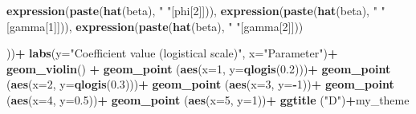 \documentclass[
]{article}
\newenvironment{Shaded}{\begin{snugshade}}{\end{snugshade}}
\newcommand{\AttributeTok}[1]{\textcolor[rgb]{0.13,0.29,0.53}{#1}}
\newcommand{\DecValTok}[1]{\textcolor[rgb]{0.00,0.00,0.81}{#1}}
\newcommand{\FloatTok}[1]{\textcolor[rgb]{0.00,0.00,0.81}{#1}}
\newcommand{\FunctionTok}[1]{\textcolor[rgb]{0.13,0.29,0.53}{\textbf{#1}}}
\newcommand{\NormalTok}[1]{#1}
\newcommand{\SpecialCharTok}[1]{\textcolor[rgb]{0.81,0.36,0.00}{\textbf{#1}}}
\newcommand{\StringTok}[1]{\textcolor[rgb]{0.31,0.60,0.02}{#1}}
\begin{document}
{\begin{Shaded}
\begin{Highlighting}[]
                            \FunctionTok{expression}\NormalTok{(}\FunctionTok{paste}\NormalTok{(}\FunctionTok{hat}\NormalTok{(beta), }\StringTok{" "}\NormalTok{[phi[}\DecValTok{2}\NormalTok{]])),}
                            \FunctionTok{expression}\NormalTok{(}\FunctionTok{paste}\NormalTok{(}\FunctionTok{hat}\NormalTok{(beta), }\StringTok{" "}\NormalTok{[gamma[}\DecValTok{1}\NormalTok{]])),}
                            \FunctionTok{expression}\NormalTok{(}\FunctionTok{paste}\NormalTok{(}\FunctionTok{hat}\NormalTok{(beta), }\StringTok{" "}\NormalTok{[gamma[}\DecValTok{2}\NormalTok{]]))}
                            
                            
\NormalTok{                            ))}\SpecialCharTok{+}
  \FunctionTok{labs}\NormalTok{(}\AttributeTok{y=}\StringTok{"Coefficient value (logistical scale)"}\NormalTok{, }\AttributeTok{x=}\StringTok{"Parameter"}\NormalTok{)}\SpecialCharTok{+}
  \FunctionTok{geom\_violin}\NormalTok{() }\SpecialCharTok{+}
  \FunctionTok{geom\_point}\NormalTok{ (}\FunctionTok{aes}\NormalTok{(}\AttributeTok{x=}\DecValTok{1}\NormalTok{, }\AttributeTok{y=}\FunctionTok{qlogis}\NormalTok{(}\FloatTok{0.2}\NormalTok{)))}\SpecialCharTok{+}
  \FunctionTok{geom\_point}\NormalTok{ (}\FunctionTok{aes}\NormalTok{(}\AttributeTok{x=}\DecValTok{2}\NormalTok{, }\AttributeTok{y=}\FunctionTok{qlogis}\NormalTok{(}\FloatTok{0.3}\NormalTok{)))}\SpecialCharTok{+}
  \FunctionTok{geom\_point}\NormalTok{ (}\FunctionTok{aes}\NormalTok{(}\AttributeTok{x=}\DecValTok{3}\NormalTok{, }\AttributeTok{y=}\SpecialCharTok{{-}}\DecValTok{1}\NormalTok{))}\SpecialCharTok{+}
  \FunctionTok{geom\_point}\NormalTok{ (}\FunctionTok{aes}\NormalTok{(}\AttributeTok{x=}\DecValTok{4}\NormalTok{, }\AttributeTok{y=}\FloatTok{0.5}\NormalTok{))}\SpecialCharTok{+}
  \FunctionTok{geom\_point}\NormalTok{ (}\FunctionTok{aes}\NormalTok{(}\AttributeTok{x=}\DecValTok{5}\NormalTok{, }\AttributeTok{y=}\DecValTok{1}\NormalTok{))}\SpecialCharTok{+}
  \FunctionTok{ggtitle}\NormalTok{ (}\StringTok{"D"}\NormalTok{)}\SpecialCharTok{+}\NormalTok{my\_theme}



\end{Highlighting}
\end{Shaded}}
\end{document}
